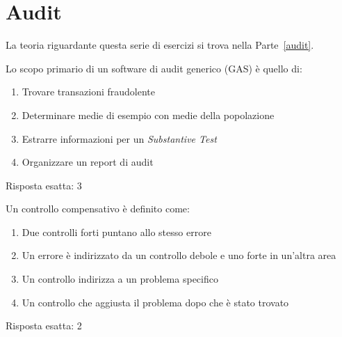 \chapter{Audit}
\label{EsAudit}

La teoria riguardante questa serie di esercizi si trova nella
Parte~\ref{audit}.

\begin{Exercise} [
  title={Quiz},
  label={audit1}
  ]

  \Question Lo scopo primario di un software di audit generico (GAS) è quello 
di:
\begin{enumerate}
 \item Trovare transazioni fraudolente
 \item Determinare medie di esempio con medie della popolazione
 \item Estrarre informazioni per un \textit{Substantive Test}
 \item Organizzare un report di audit
\end{enumerate}

\end{Exercise}


\begin{Answer} [
  ref={audit1},
  number={1}
  ]

  \Question Risposta esatta: 3

\end{Answer}


\begin{Exercise} [
  title={Quiz},
  label={audit2}
  ]

  \Question Un controllo compensativo è definito come:
  \begin{enumerate}
   \item Due controlli forti puntano allo stesso errore
   \item Un errore è indirizzato da un controllo debole e uno forte in un'altra 
area
   \item Un controllo indirizza a un problema specifico
   \item Un controllo che aggiusta il problema dopo che è stato trovato
  \end{enumerate}

\end{Exercise}


\begin{Answer} [
  ref={audit2},
  number={2}
  ]

  \Question Risposta esatta: 2

\end{Answer}


